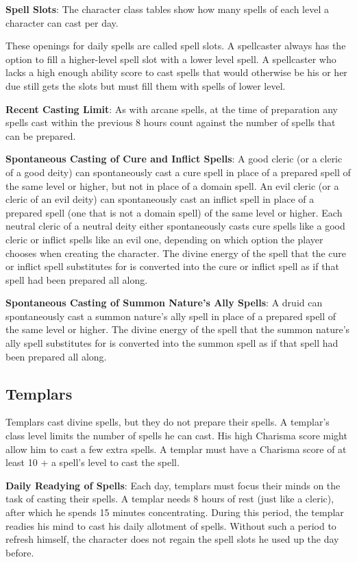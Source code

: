 \textbf{Spell Slots}: The character class tables show how many spells of each level a character can cast per day.

These openings for daily spells are called spell slots. A spellcaster always has the option to fill a higher-level spell slot with a lower level spell. A spellcaster who lacks a high enough ability score to cast spells that would otherwise be his or her due still gets the slots but must fill them with spells of lower level.

\textbf{Recent Casting Limit}: As with arcane spells, at the time of preparation any spells cast within the previous 8 hours count against the number of spells that can be prepared.

\textbf{Spontaneous Casting of Cure and Inflict Spells}: A good cleric (or a cleric of a good deity) can spontaneously cast a cure spell in place of a prepared spell of the same level or higher, but not in place of a domain spell. An evil cleric (or a cleric of an evil deity) can spontaneously cast an inflict spell in place of a prepared spell (one that is not a domain spell) of the same level or higher. Each neutral cleric of a neutral deity either spontaneously casts cure spells like a good cleric or inflict spells like an evil one, depending on which option the player chooses when creating the character. The divine energy of the spell that the cure or inflict spell substitutes for is converted into the cure or inflict spell as if that spell had been prepared all along.

\textbf{Spontaneous Casting of Summon Nature's Ally Spells}: A druid can spontaneously cast a summon nature's ally spell in place of a prepared spell of the same level or higher. The divine energy of the spell that the summon nature's ally spell substitutes for is converted into the summon spell as if that spell had been prepared all along.

\subsection{Templars}
Templars cast divine spells, but they do not prepare their spells. A templar's class level limits the number of spells he can cast. His high Charisma score might allow him to cast a few extra spells. A templar must have a Charisma score of at least 10 + a spell’s level to cast the spell.

\textbf{Daily Readying of Spells}: Each day, templars must focus their minds on the task of casting their spells. A templar needs 8 hours of rest (just like a cleric), after which he spends 15 minutes concentrating. During this period, the templar readies his mind to cast his daily allotment of spells. Without such a period to refresh himself, the character does not regain the spell slots he used up the day before.

